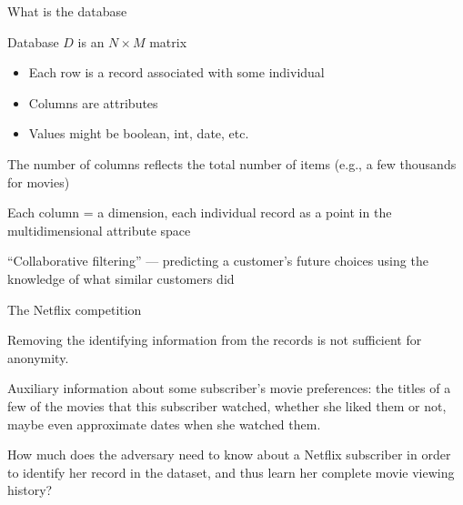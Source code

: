 \documentclass[12pt,aspectratio=169,handout]{beamer}
\begin{document}
\begin{frame}{What is the database}


Database $D$ is an $N \times M$ matrix

\begin{itemize}
\item Each row is a record associated with some individual
\item Columns are attributes
\item Values might be boolean, int, date, etc.
\end{itemize}

The number of columns reflects the total number of items (e.g., a few thousands for movies)

Each column = a dimension, each individual record as a point in the multidimensional attribute space

``Collaborative filtering'' --- predicting a customer’s future choices using the knowledge of what similar customers did




\end{frame}






\begin{frame}{The Netflix competition}

Removing the identifying information from the records is not sufficient for anonymity.

\pause
Auxiliary information about some subscriber’s movie preferences: the titles of a few of the movies that this subscriber watched, whether she liked them or not, maybe even approximate dates when she watched them.

\pause
How much does the adversary need to know about a Netflix subscriber in order to identify her record in the dataset, and thus learn her complete movie viewing history?


\end{frame}
\end{document}
